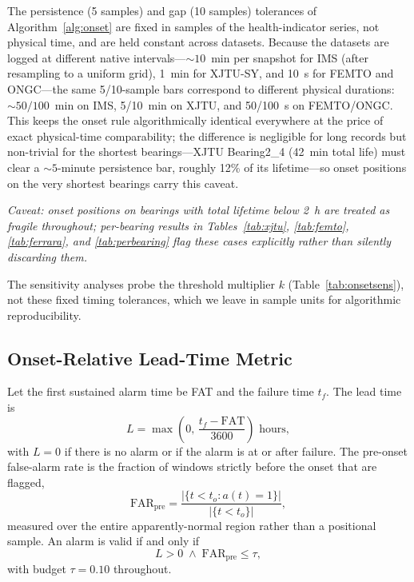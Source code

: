 \documentclass[IJPHM, 2026, 0]{PHMSociety}
\begin{document}
The persistence (5 samples) and gap (10 samples) tolerances of Algorithm~\ref{alg:onset} are fixed in samples of the health-indicator series, not physical time, and are held constant across datasets. Because the datasets are logged at different native intervals---${\sim}10$~min per snapshot for IMS (after resampling to a uniform grid), 1~min for XJTU-SY, and 10~s for FEMTO and ONGC---the same 5/10-sample bars correspond to different physical durations: ${\sim}50/100$~min on IMS, 5/10~min on XJTU, and 50/100~s on FEMTO/ONGC. This keeps the onset rule algorithmically identical everywhere at the price of exact physical-time comparability; the difference is negligible for long records but non-trivial for the shortest bearings---XJTU Bearing2\_4 (42~min total life) must clear a ${\sim}5$-minute persistence bar, roughly 12\% of its lifetime---so onset positions on the very shortest bearings carry this caveat.

\medskip
\noindent\textit{Caveat: onset positions on bearings with total lifetime below 2~h are treated as fragile throughout; per-bearing results in Tables~\ref{tab:xjtu}, \ref{tab:femto}, \ref{tab:ferrara}, and \ref{tab:perbearing} flag these cases explicitly rather than silently discarding them.}
\medskip

\noindent The sensitivity analyses probe the threshold multiplier $k$ (Table~\ref{tab:onsetsens}), not these fixed timing tolerances, which we leave in sample units for algorithmic reproducibility.

\subsection{Onset-Relative Lead-Time Metric}
Let the first sustained alarm time be FAT and the failure time $t_f$. The lead time is
\begin{equation}
L = \max\!\left(0,\, \frac{t_f - \text{FAT}}{3600}\right) \text{ hours},
\label{eq:lead}
\end{equation}
with $L=0$ if there is no alarm or if the alarm is at or after failure. The pre-onset false-alarm rate is the fraction of windows strictly before the onset that are flagged,
\begin{equation}
\text{FAR}_{\text{pre}} = \frac{|\{t < t_o : a(t)=1\}|}{|\{t < t_o\}|},
\label{eq:farpre}
\end{equation}
measured over the entire apparently-normal region rather than a positional sample. An alarm is valid if and only if
\begin{equation}
L > 0 \;\wedge\; \text{FAR}_{\text{pre}} \le \tau,
\label{eq:valid}
\end{equation}
with budget $\tau=0.10$ throughout.
\end{document}
